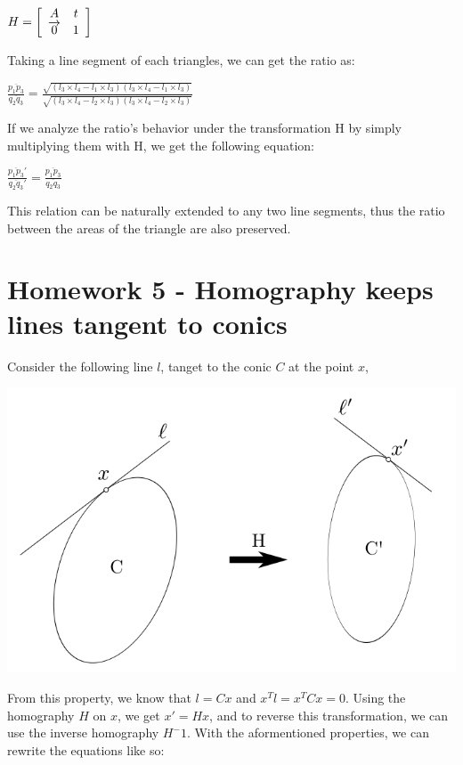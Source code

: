\documentclass[]{article}
\begin{document}
\centerline{ $H = \left[ {\begin{array}{*{20}c}
		A & t \\
		\overrightarrow{0} & 1   
		\end{array} } \right]$ }

Taking a line segment of each triangles, we can get the ratio as:

\centerline {
	$\frac{\overline{p_1p_3}}{\overline{q_2q_3}} = \frac{\sqrt{(l_3 \times l_4 - l_1 \times l_3)(l_3 \times l_4 - l_1 \times l_3)}}{\sqrt{(l_3 \times l_4 - l_2 \times l_3)(l_3 \times l_4 - l_2 \times l_3)}}$
}

If we analyze the ratio's behavior under the transformation H by simply multiplying them with H, we get the following equation: 

\centerline {
	$\frac{\overline{p_1p_3}'}{\overline{q_2q_3}'} = \frac{\overline{p_1p_3}}{\overline{q_2q_3}}$
}

This relation can be naturally extended to any two line segments, thus the ratio between the areas of the triangle are also preserved. 


\section{Homework 5 - Homography keeps lines tangent to conics}
Consider the following line $l$, tanget to the conic $C$ at the point $x$, 

\centerline {
	\includegraphics[scale=0.5]{scr3}
}

From this property, we know that $l = Cx$ and $x^Tl=x^TCx = 0$. Using the homography $H$ on $x$, we get $x'=Hx$, and to reverse this transformation, we can use the inverse homography $H^-1$. With the aformentioned properties, we can rewrite the equations like so:
\end{document}
